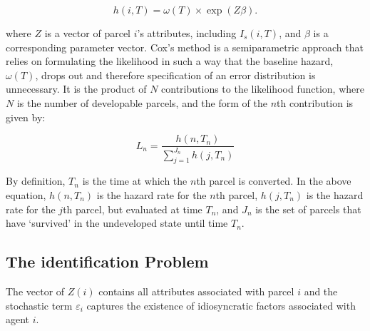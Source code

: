 \begin{equation}
    h(i, T) = \omega(T) \times \exp(Z\beta).
\end{equation}

where $Z$ is a vector of parcel $i$'s attributes, including $I_s(i, T)$, and $\beta$ is a corresponding parameter vector. Cox's method is a semiparametric approach that relies on formulating the likelihood in such a way that the baseline hazard, $\omega(T)$, drops out and therefore specification of an error distribution is unnecessary. It is the product of $N$ contributions to the likelihood function, where $N$ is the number of developable parcels, and the form of the $n$th contribution is given by:

\begin{equation}
    L_n = \frac{h(n, T_n)}{\sum_{j=1}^{J_n} h(j, T_n)}
\end{equation}

By definition, $T_n$ is the time at which the $n$th parcel is converted. In the above equation, $h(n, T_n)$ is the hazard rate for the $n$th parcel, $h(j, T_n)$ is the hazard rate for the $j$th parcel, but evaluated at time $T_n$, and $J_n$ is the set of parcels that have `survived' in the undeveloped state until time $T_n$.

\subsection{The identification Problem}

The vector of $Z(i)$ contains all attributes associated with parcel $i$ and the stochastic term $\varepsilon_i$ captures the existence of idiosyncratic factors associated with agent $i$.


